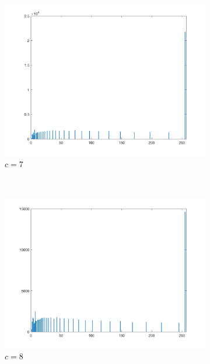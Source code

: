 \documentclass{article}
\begin{document}
\begin{enumerate}[label=(\alph*)]
\begin{figure}[!htb]
        \begin{subfigure}[b]{0.3\textwidth}
            \includegraphics[width=\textwidth]{img/hist_ILT7.png}
            \caption{$c = 7$}
        \end{subfigure}
        ~
        \begin{subfigure}[b]{0.3\textwidth}
            \includegraphics[width=\textwidth]{img/hist_ILT8.png}
            \caption{$c = 8$}
        \end{subfigure}
        ~
        \begin{subfigure}[b]{0.3\textwidth}

\end{subfigure}
\end{figure}
\end{enumerate}
\end{document}
